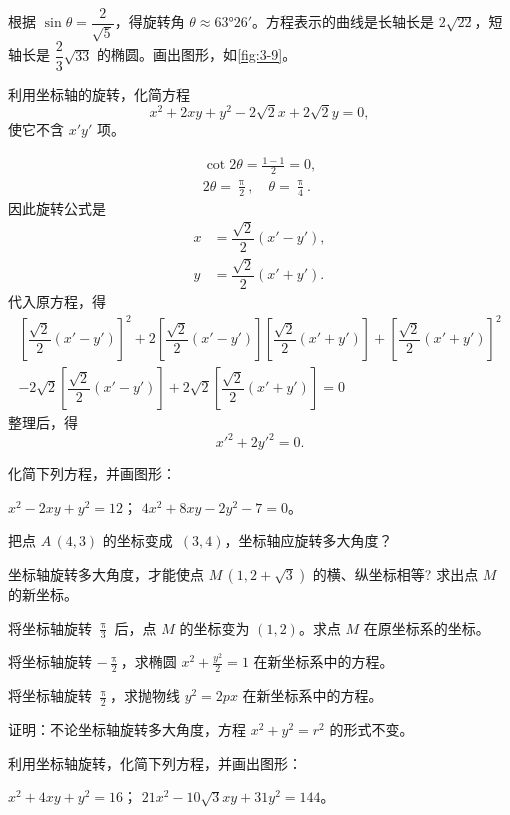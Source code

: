   根据 $\sin\theta=\dfrac{2}{\sqrt{5}}$，得旋转角 $\theta \approx \ang{63;26;}$。方程表示的曲线是长轴长是 $2\sqrt{22}$，短轴长是 $\dfrac{2}{3}\sqrt{33}$ 的椭圆。画出图形，如\cref{fig:3-9}。

\begin{example}
  利用坐标轴的旋转，化简方程
  \[x^2+2xy+y^2-2\sqrt{2}x+2\sqrt{2}y=0,\]
  使它不含 $x'y'$ 项。
\end{example}
\begin{solution}
\begin{gather*}
  \cot 2\theta=\frac{1-1}{2}=0,\\ 
  2\theta=\frac{\uppi}{2},\quad \theta=\frac{\uppi}{4}.
\end{gather*}
因此旋转公式是
\begin{align*}
  x&=\dfrac{\sqrt{2}}{2}(x'-y'),\\
  y&=\dfrac{\sqrt{2}}{2}(x'+y').
\end{align*}
代入原方程，得
\begin{multline*}
  \left[\dfrac{\sqrt{2}}{2}(x'-y')\right]^2+2\left[\dfrac{\sqrt{2}}{2}(x'-y')\right]\left[\dfrac{\sqrt{2}}{2}(x'+y')\right]+\left[\dfrac{\sqrt{2}}{2}(x'+y')\right]^2\\
  -2\sqrt{2}\left[\dfrac{\sqrt{2}}{2}(x'-y')\right]+2\sqrt{2}\left[\dfrac{\sqrt{2}}{2}(x'+y')\right]=0
\end{multline*}
整理后，得
\[x'^2+2y'^2=0.\]
\end{solution}

\begin{Practice}
  化简下列方程，并画图形：
  \begin{tasks}
    \task $x^2-2xy+y^2=12$；
    \task $4x^2+8xy-2y^2-7=0$。
  \end{tasks}
\end{Practice}

\begin{Exercise}
  \begin{question}
    \item 把点 $A\,(4,3)$ 的坐标变成 $\,(3,4)$，坐标轴应旋转多大角度？
    \item 坐标轴旋转多大角度，才能使点 $M\,(1,2+\sqrt{3})$ 的横、纵坐标相等? 求出点 $M$ 的新坐标。
    \item 将坐标轴旋转 $\frac{\uppi}{3}$ 后，点 $M$ 的坐标变为 $(1,2)$。求点 $M$ 在原坐标系的坐标。
    \item 将坐标轴旋转 $-\frac{\uppi}{2}$，求椭圆 $x^2+\frac{y^2}{2}=1$ 在新坐标系中的方程。
    \item 将坐标轴旋转 $\frac{\uppi}{2}$，求抛物线 $y^2=2px$ 在新坐标系中的方程。
    \item 证明：不论坐标轴旋转多大角度，方程 $x^2+y^2=r^2$ 的形式不变。
    \item 利用坐标轴旋转，化简下列方程，并画出图形：
    \begin{tasks}
      \task $x^2+4xy+y^2=16$；
      \task $21x^2-10\sqrt{3}xy+31y^2=144$。
    \end{tasks}
  \end{question}
\end{Exercise}

